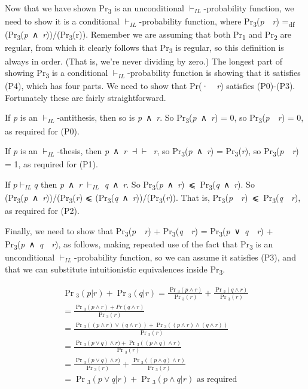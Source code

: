\documentclass[
  11pt,
  letterpaper,
  DIV=11,
  numbers=noendperiod,
  twoside]{scrartcl}
\begin{document}
Now that we have shown Pr\textsubscript{3} is an unconditional
\(\vdash_{IL}\)-probability function, we need to show it is a
conditional \(\vdash_{IL}\)-probability function, where
Pr\textsubscript{3}(\emph{p}~\textbar~\emph{r}) =\textsubscript{df}
(Pr\textsubscript{3}(\emph{p}~∧~\emph{r}))/(Pr\textsubscript{3}(r)).
Remember we are assuming that both Pr\textsubscript{1} and
Pr\textsubscript{2} are regular, from which it clearly follows that
Pr\textsubscript{3} is regular, so this definition is always in order.
(That is, we're never dividing by zero.) The longest part of showing
Pr\textsubscript{3} is a conditional \(\vdash_{IL}\)-probability
function is showing that it satisfies (P4), which has four parts. We
need to show that Pr(·~\textbar~\emph{r}) satisfies (P0)-(P3).
Fortunately these are fairly straightforward.

If \emph{p} is an \(\vdash_{IL}\)-antithesis, then so is
\emph{p}~∧~\emph{r}. So Pr\textsubscript{3}(\emph{p}~∧~\emph{r}) = 0, so
Pr\textsubscript{3}(\emph{p}~\textbar~\emph{r}) = 0, as required for
(P0).

If \emph{p} is an \(\vdash_{IL}\)-thesis, then \emph{p}~∧~\emph{r}
\(\dashv \vdash\)~\emph{r}, so Pr\textsubscript{3}(\emph{p}~∧~\emph{r})
= Pr\textsubscript{3}(\emph{r}), so
Pr\textsubscript{3}(\emph{p}~\textbar~\emph{r}) = 1, as required for
(P1).

If \(p \vdash_{IL} q\) then \emph{p}~∧~\emph{r} \(\vdash_{IL}\)
\emph{q}~∧~\emph{r}. So
Pr\textsubscript{3}(\emph{p}~∧~\emph{r})~⩽~Pr\textsubscript{3}(\emph{q}~∧~\emph{r}).
So
(Pr\textsubscript{3}(\emph{p}~∧~\emph{r}))/(Pr\textsubscript{3}(\emph{r})
⩽
(Pr\textsubscript{3}(\emph{q}~∧~\emph{r}))/(Pr\textsubscript{3}(\emph{r})).
That is,
Pr\textsubscript{3}(\emph{p}~\textbar~\emph{r})~⩽~Pr\textsubscript{3}(\emph{q}~\textbar~\emph{r}),
as required for (P2).

Finally, we need to show that
Pr\textsubscript{3}(\emph{p}~\textbar~\emph{r}) +
Pr\textsubscript{3}(\emph{q}~\textbar~\emph{r}) =
Pr\textsubscript{3}(\emph{p}~∨~\emph{q}~\textbar~\emph{r}) +
Pr\textsubscript{3}(\emph{p}~∧~\emph{q}~\textbar~\emph{r}), as follows,
making repeated use of the fact that Pr\textsubscript{3} is an
unconditional \(\vdash_{IL}\)-probability function, so we can assume it
satisfies (P3), and that we can substitute intuitionistic equivalences
inside Pr\textsubscript{3}.

\[
\begin{aligned}
\Pr{}_3(p | r) + \Pr{}_3(q | r) = \frac{\Pr{}_3(p ∧ r)}{\Pr{}_3(r)} + \frac{\Pr{}_3(q ∧ r)}{\Pr{}_3(r)} \\
= \frac{\Pr{}_3(p ∧ r) + Pr(q ∧ r)}{\Pr{}_3(r)} \\
= \frac{\Pr{}_3((p ∧ r) ∨ (q ∧ r)) + \Pr{}_3((p ∧ r) ∧ (q ∧ r))}{\Pr{}_3(r)} \\
=\frac{\Pr{}_3(p ∨ q) ∧ r) + \Pr{}_3((p ∧ q) ∧ r)}{\Pr{}_3(r)} \\
=\frac{\Pr{}_3(p ∨ q) ∧ r)}{\Pr{}_3(r)} + \frac{\Pr{}_3((p ∧ q) ∧ r)}{\Pr{}_3(r)} \\
=\Pr{}_3(p ∨ q | r) + \Pr{}_3(p ∧ q | r) \text{ as required}
\end{aligned}
\]
\end{document}
